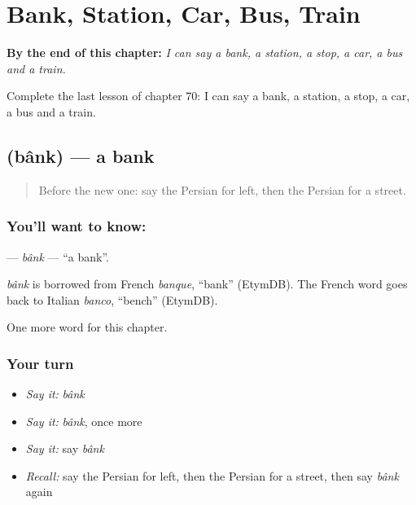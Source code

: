 
\chapter{Bank, Station, Car, Bus, Train}
\label{ch:fa-bank-station-car-bus-train}

\begin{chapteropening}
\textbf{By the end of this chapter:} \emph{I can say a bank, a station, a stop, a car, a bus and a train.}

Complete the last lesson of chapter 70: I can say a bank, a station, a stop, a car, a bus and a train.
\end{chapteropening}

\section[\texorpdfstring{\fa{بانک} (bânk)}{بانک (bânk)}]{ (bânk) — a bank}

\label{lesson:FA-C70-bank}



\begin{quote}
Before the new one: say the Persian for left, then the Persian for a street.
\end{quote}

\subsection*{You'll want to know: }
\textbf{} — \emph{bânk} — \textquotedblleft{}a bank\textquotedblright{}.

\begin{cousinweb}
\emph{bânk} is borrowed from French \emph{banque}, \textquotedblleft{}bank\textquotedblright{} (EtymDB). The French word goes back to Italian \emph{banco}, \textquotedblleft{}bench\textquotedblright{} (EtymDB).
\end{cousinweb}

\begin{grammarlens}[title={What you've built}]
One more word for this chapter.
\end{grammarlens}

\subsection*{Your turn}
\begin{itemize}
\raggedright
  \item \emph{Say it:} \emph{bânk}
  \item \emph{Say it:} \emph{bânk}, once more
  \item \emph{Say it:} say \emph{bânk}
  \item \emph{Recall:} say the Persian for left, then the Persian for a street, then say \emph{bânk} again
\end{itemize}

